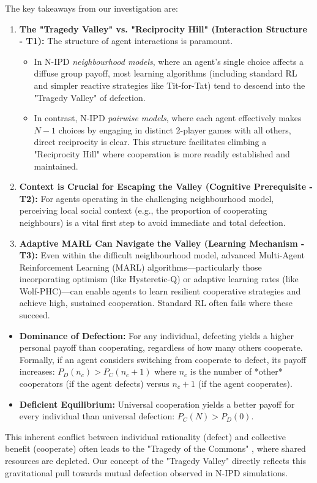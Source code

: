 \documentclass[]{llncs} %
\begin{document}
The key takeaways from our investigation are:
\begin{enumerate}
    \item \textbf{The "Tragedy Valley" vs. "Reciprocity Hill" (Interaction Structure - T1):} The structure of agent interactions is paramount.
        \begin{itemize}
            \item In N-IPD \textit{neighbourhood models}, where an agent's single choice affects a diffuse group payoff, most learning algorithms (including standard RL and simpler reactive strategies like Tit-for-Tat) tend to descend into the "Tragedy Valley" of defection.
            \item In contrast, N-IPD \textit{pairwise models}, where each agent effectively makes $N-1$ choices by engaging in distinct 2-player games with all others, direct reciprocity is clear. This structure facilitates climbing a "Reciprocity Hill" where cooperation is more readily established and maintained.
        \end{itemize}
    \item \textbf{Context is Crucial for Escaping the Valley (Cognitive Prerequisite - T2):} For agents operating in the challenging neighbourhood model, perceiving local social context (e.g., the proportion of cooperating neighbours) is a vital first step to avoid immediate and total defection.
    \item \textbf{Adaptive MARL Can Navigate the Valley (Learning Mechanism - T3):} Even within the difficult neighbourhood model, advanced Multi-Agent Reinforcement Learning (MARL) algorithms—particularly those incorporating optimism (like Hysteretic-Q) or adaptive learning rates (like Wolf-PHC)—can enable agents to learn resilient cooperative strategies and achieve high, sustained cooperation. Standard RL often fails where these succeed.
\end{enumerate}


\begin{itemize}
    \item \textbf{Dominance of Defection:} For any individual, defecting yields a higher personal payoff than cooperating, regardless of how many others cooperate. Formally, if an agent considers switching from cooperate to defect, its payoff increases: $P_D(n_c) > P_C(n_c+1)$ where $n_c$ is the number of *other* cooperators (if the agent defects) versus $n_c+1$ (if the agent cooperates).
    \item \textbf{Deficient Equilibrium:} Universal cooperation yields a better payoff for every individual than universal defection: $P_C(N) > P_D(0)$.
\end{itemize}
This inherent conflict between individual rationality (defect) and collective benefit (cooperate) often leads to the "Tragedy of the Commons" \cite{Hardin1968}, where shared resources are depleted. Our concept of the "Tragedy Valley" directly reflects this gravitational pull towards mutual defection observed in N-IPD simulations.
\end{document}
